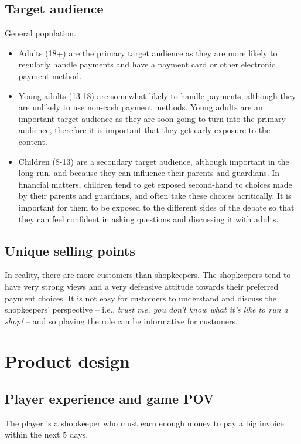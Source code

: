 \documentclass[a4paper,11pt]{article}
\begin{document}
\subsection{Target audience}\label{target-audience}
General population.

\begin{itemize}
  \item Adults (18+) are the primary target audience as they are more likely to regularly handle payments and have a payment card or other electronic payment method.
  \item Young adults (13-18) are somewhat likely to handle payments, although they are unlikely to use non-cash payment methods. Young adults are an important target audience as they are soon going to turn into the primary audience, therefore it is important that they get early exposure to the content.
  \item Children (8-13) are a secondary target audience, although important in the long run, and because they can influence their parents and guardians. In financial matters, children tend to get exposed second-hand to choices made by their parents and guardians, and often take these choices acritically. It is important for them to be exposed to the different sides of the debate so that they can feel confident in asking questions and discussing it with adults.
\end{itemize}

\subsection{Unique selling points}\label{unique-selling-points}
In reality, there are more customers than shopkeepers. The shopkeepers tend to have very strong views and a very defensive attitude towards their preferred payment choices. It is not easy for customers to understand and discuss the shopkeepers' perspective -- i.e., \textit{trust me, you don't know what it's like to run a shop!} -- and so playing the role can be informative for customers.

\section{Product design}\label{product-design}
\subsection{Player experience and game POV}\label{player-experience-and-game-pov}
The player is a shopkeeper who must earn enough money to pay a big invoice within the next 5 days.
\end{document}
